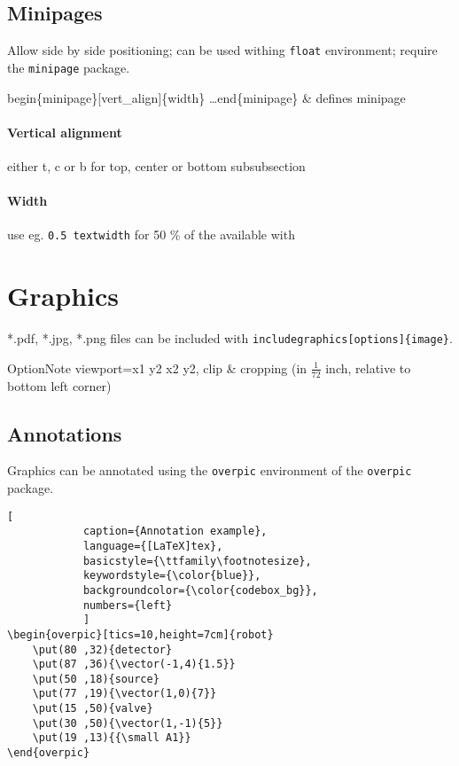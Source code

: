    \subsection{Minipages}
        Allow side by side positioning; can be used withing \texttt{float} environment; require the \texttt{minipage} package.
        
        \begin{cmdtab}
            \bs begin\{minipage\}[vert\_align]\{width\} \dots \bs end\{minipage\} & defines minipage \\
        \end{cmdtab}

        \paragraph{Vertical alignment}{
            either t, c or b for top, center or bottom
        }
        subsubsection
        \paragraph{Width}{
            use eg. \texttt{0.5 \bs textwidth} for 50 \% of the available with
        }

\section{Graphics}
    \label{section:graphics}
    *.pdf, *.jpg, *.png files can be included with \texttt{\bs includegraphics[options]\{image\}}.

    \begin{cmdtabx}{Option}{Note}
        viewport=x1 y2 x2 y2, clip & cropping (in $ \frac{1}{72} $ inch, relative to bottom left corner) \\
    \end{cmdtabx}
    
    \subsection{Annotations}
        Graphics can be annotated using the \texttt{overpic} environment of the \texttt{overpic} package.
        
        \begin{lstlisting}[
            caption={Annotation example},
            language={[LaTeX]tex},
            basicstyle={\ttfamily\footnotesize},
            keywordstyle={\color{blue}},
            backgroundcolor={\color{codebox_bg}},
            numbers={left}
            ]
\begin{overpic}[tics=10,height=7cm]{robot}
    \put(80 ,32){detector}
    \put(87 ,36){\vector(-1,4){1.5}}
    \put(50 ,18){source}
    \put(77 ,19){\vector(1,0){7}}
    \put(15 ,50){valve}
    \put(30 ,50){\vector(1,-1){5}}
    \put(19 ,13){{\small A1}}
\end{overpic}
        \end{lstlisting}

